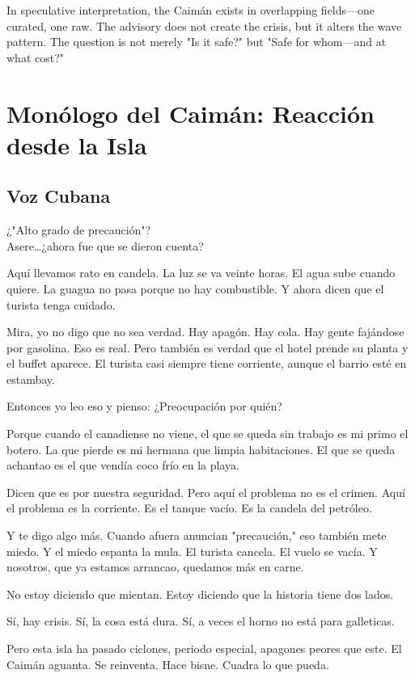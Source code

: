 \documentclass[12pt]{article}
\begin{document}
In speculative interpretation, the Caimán exists in overlapping fields---one curated, one raw. The advisory does not create the crisis, but it alters the wave pattern. The question is not merely "Is it safe?" but "Safe for whom---and at what cost?"

\section{Monólogo del Caimán: Reacción desde la Isla}

\subsection*{Voz Cubana}

¿"Alto grado de precaución"?\\
Asere\ldots ¿ahora fue que se dieron cuenta?

Aquí llevamos rato en candela. La luz se va veinte horas. El agua sube cuando quiere. La guagua no pasa porque no hay combustible. Y ahora dicen que el turista tenga cuidado.

Mira, yo no digo que no sea verdad. Hay apagón. Hay cola. Hay gente fajándose por gasolina. Eso es real. Pero también es verdad que el hotel prende su planta y el buffet aparece. El turista casi siempre tiene corriente, aunque el barrio esté en estambay.

Entonces yo leo eso y pienso: ¿Preocupación por quién?

Porque cuando el canadiense no viene, el que se queda sin trabajo es mi primo el botero. La que pierde es mi hermana que limpia habitaciones. El que se queda achantao es el que vendía coco frío en la playa.

Dicen que es por nuestra seguridad. Pero aquí el problema no es el crimen. Aquí el problema es la corriente. Es el tanque vacío. Es la candela del petróleo.

Y te digo algo más. Cuando afuera anuncian "precaución," eso también mete miedo. Y el miedo espanta la mula. El turista cancela. El vuelo se vacía. Y nosotros, que ya estamos arrancao, quedamos más en carne.

No estoy diciendo que mientan. Estoy diciendo que la historia tiene dos lados.

Sí, hay crisis. Sí, la cosa está dura. Sí, a veces el horno no está para galleticas.

Pero esta isla ha pasado ciclones, periodo especial, apagones peores que este. El Caimán aguanta. Se reinventa. Hace bisne. Cuadra lo que pueda.
\end{document}

